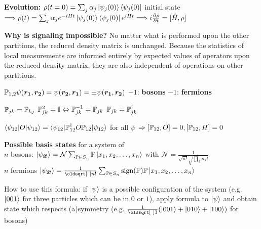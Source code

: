 \begin{squishlist}
    \item \textbf{Evolution:} $\rho(t=0) = \sum_j \alpha_j \ket{\psi_j(0)}\bra{\psi_j(0)}$ initial state \\ $\Longrightarrow \rho(t) = \sum_j \alpha_j e^{-iHt} \ket{\psi_j(0)}\bra{\psi_j(0)}e^{iHt} \Longrightarrow i \D{t}{\rho} = [\hat{H},\rho]$
    \item \textbf{Why is signaling impossible?} No matter what is performed upon the other partitions, the reduced density matrix is unchanged. Because the statistics of local measurements are informed entirely by expected values of operators upon the reduced density matrix, they are also independent of operations on other partitions.
\end{squishlist}

\begin{squishlist}
    \item $\P_{1,2} \psi(\vec{r_1}, \vec{r_2}) = \psi(\vec{r_2}, \vec{r_1}) = \pm \psi(\vec{r_1}, \vec{r_2})$ \quad $+1$: \textbf{bosons} \quad $-1$: \textbf{fermions}
    \item $\P_{jk} = \P_{kj}$ \squishsep $\P_{jk}^2 = \id \Leftrightarrow \P_{jk}^{-1}=\P_{jk}$ \squishsep $\P_{jk} = \P_{jk}^{\dagger}$
    \item $\braket{\psi_{12}|O|\psi_{12}} = \braket{\psi_{12}|\P_{12}^{\dagger}O\P_{12}|\psi_{12}}$ for all $\psi$ $\Rightarrow [\P_{12},O] = 0, [\P_{12},H] = 0$
    \item \textbf{Possible basis states} for a system of \\ $n$ bosons: $\ket{\psi_{\vec{x}}} = \mathcal{N} \sum_{\P \in S_n} \P\ket{x_1,x_2, \ldots, x_n}$ with $\mathcal{N} = \frac{1}{\sqrt{n!}\sqrt{\prod_k n_k !}}$ \\
    $n$ fermions $\ket{\psi_{\vec{x}}} = \frac{1}{\sqrt{n!}} \sum_{\P \in S_n} \text{sign}(\P) \P \ket{x_1, x_2, \ldots, x_n}$
    \item How to use this formula: if $\kpsi$ is a possible configuration of the system (e.g. $\ket{001}$ for three particles which can be in $0$ or $1$), apply formula to $\kpsi$ and obtain state which respects (a)symmetry (e.g. $\frac{1}{\sqrt{3}}(\ket{001} + \ket{010} + \ket{100})$ for bosons)
\end{squishlist}

